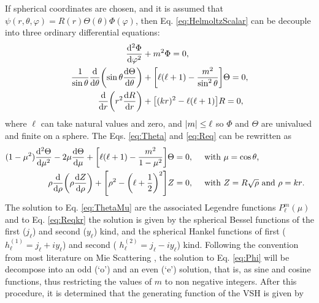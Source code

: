 If spherical coordinates are chosen, and it is assumed that $\psi(r,\theta,\varphi) = R(r)\Theta(\theta)\Phi(\varphi)$, then Eq. \eqref{eq:HelmoltzScalar} can be decouple into three ordinary differential equations:
%
 \begin{align}
	\dv[2]{\Phi}{\varphi} &+ m^2 \Phi =0,
 		\label{eq:Phi}\\
	\frac{1}{\sin\theta}\dv{\theta}\qty(\sin\theta\dv{\Theta}{\theta}) &+ \qty[\ell(\ell+1)- \frac{m^2}{\sin^2\theta}]\Theta =0,
		\label{eq:Theta}\\
	\dv{r}\qty(r^2\dv{R}{r}) &+ \qty[ (k r)^2 - \ell (\ell +1)] R =0,
 		\label{eq:Req}
\end{align}
%
where $\ell$ can take natural values and zero, and $\abs{m}\leq \ell$ so $\Phi$ and $\Theta$ are univalued and finite on a sphere. The Eqs. \eqref{eq:Theta} and \eqref{eq:Req} can be rewritten as
%
 \begin{align}
(1-\mu^2)\dv[2]{\Theta}{\mu} - 2\mu\dv{\Theta}{\mu} + \qty[\ell(\ell+1)-\frac{m^2}{1-\mu^2}]\Theta &= 0, \qqtext{ with $\mu = \cos\theta$,}
	\label{eq:ThetaMu}\\
	\rho\dv{\rho}\qty(\rho\dv{Z}{\rho}) +  \qty[\rho^2 - \qty(\ell + \frac12)^2]Z  &= 0,  \qqtext{ with $Z = R\sqrt{\rho}$ and $\rho = kr$.}
\label{eq:Reqkr}
\end{align}
%
The solution to Eq. \eqref{eq:ThetaMu} are the associated Legendre functions $ P_\ell^m(\mu)$ and to Eq. \eqref{eq:Reqkr} the solution is given by the spherical Bessel functions of the first ($j_\ell$)  and second ($y_\ell$) kind, and the spherical Hankel functions of first ($h_\ell^{(1)} = j_\ell + iy_\ell$) and second ( $h_\ell^{(2)} = j_\ell - iy_\ell$)  kind. Following the convention from most literature on Mie Scattering \cite{zangwill_modern_2013}, the solution to Eq. \eqref{eq:Phi} will be decompose into an odd (`o') and an even (`e') solution, that is, as sine and cosine functions, thus restricting the values of $m$ to non negative integers. After this procedure, it is determined that the generating function of the VSH is given by
%
%
%
%
